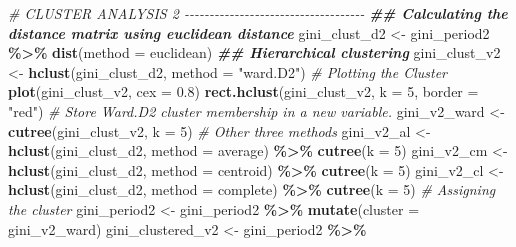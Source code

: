 \documentclass[11pt,a4paper,]{article}
\newenvironment{Shaded}{\begin{snugshade}}{\end{snugshade}}
\newcommand{\AttributeTok}[1]{\textcolor[rgb]{0.13,0.29,0.53}{#1}}
\newcommand{\CommentTok}[1]{\textcolor[rgb]{0.56,0.35,0.01}{\textit{#1}}}
\newcommand{\DecValTok}[1]{\textcolor[rgb]{0.00,0.00,0.81}{#1}}
\newcommand{\DocumentationTok}[1]{\textcolor[rgb]{0.56,0.35,0.01}{\textbf{\textit{#1}}}}
\newcommand{\FloatTok}[1]{\textcolor[rgb]{0.00,0.00,0.81}{#1}}
\newcommand{\FunctionTok}[1]{\textcolor[rgb]{0.13,0.29,0.53}{\textbf{#1}}}
\newcommand{\NormalTok}[1]{#1}
\newcommand{\OtherTok}[1]{\textcolor[rgb]{0.56,0.35,0.01}{#1}}
\newcommand{\SpecialCharTok}[1]{\textcolor[rgb]{0.81,0.36,0.00}{\textbf{#1}}}
\newcommand{\StringTok}[1]{\textcolor[rgb]{0.31,0.60,0.02}{#1}}
\begin{document}
\begin{Shaded}
\begin{Highlighting}[]
\CommentTok{\# CLUSTER ANALYSIS 2  {-}{-}{-}{-}{-}{-}{-}{-}{-}{-}{-}{-}{-}{-}{-}{-}{-}{-}{-}{-}{-}{-}{-}{-}{-}{-}{-}{-}{-}{-}{-}{-}{-}{-}{-}{-}}
\DocumentationTok{\#\# Calculating the distance matrix using euclidean distance}
\NormalTok{gini\_clust\_d2 }\OtherTok{\textless{}{-}}\NormalTok{ gini\_period2 }\SpecialCharTok{\%\textgreater{}\%} \FunctionTok{dist}\NormalTok{(}\AttributeTok{method =} \StringTok{\textquotesingle{}euclidean\textquotesingle{}}\NormalTok{)}
\DocumentationTok{\#\# Hierarchical clustering }
\NormalTok{gini\_clust\_v2 }\OtherTok{\textless{}{-}} \FunctionTok{hclust}\NormalTok{(gini\_clust\_d2, }\AttributeTok{method =} \StringTok{"ward.D2"}\NormalTok{)}
\CommentTok{\# Plotting the Cluster}
\FunctionTok{plot}\NormalTok{(gini\_clust\_v2, }\AttributeTok{cex =} \FloatTok{0.8}\NormalTok{)}
\FunctionTok{rect.hclust}\NormalTok{(gini\_clust\_v2, }\AttributeTok{k =} \DecValTok{5}\NormalTok{, }\AttributeTok{border =} \StringTok{"red"}\NormalTok{)}
\CommentTok{\# Store Ward.D2 cluster membership in a new variable.}
\NormalTok{gini\_v2\_ward }\OtherTok{\textless{}{-}} \FunctionTok{cutree}\NormalTok{(gini\_clust\_v2, }\AttributeTok{k =} \DecValTok{5}\NormalTok{)}
\CommentTok{\# Other three methods}
\NormalTok{gini\_v2\_al }\OtherTok{\textless{}{-}} \FunctionTok{hclust}\NormalTok{(gini\_clust\_d2, }\AttributeTok{method =} \StringTok{\textquotesingle{}average\textquotesingle{}}\NormalTok{) }\SpecialCharTok{\%\textgreater{}\%} \FunctionTok{cutree}\NormalTok{(}\AttributeTok{k =} \DecValTok{5}\NormalTok{) }
\NormalTok{gini\_v2\_cm }\OtherTok{\textless{}{-}} \FunctionTok{hclust}\NormalTok{(gini\_clust\_d2, }\AttributeTok{method =} \StringTok{\textquotesingle{}centroid\textquotesingle{}}\NormalTok{) }\SpecialCharTok{\%\textgreater{}\%} \FunctionTok{cutree}\NormalTok{(}\AttributeTok{k =} \DecValTok{5}\NormalTok{) }
\NormalTok{gini\_v2\_cl }\OtherTok{\textless{}{-}} \FunctionTok{hclust}\NormalTok{(gini\_clust\_d2, }\AttributeTok{method =} \StringTok{\textquotesingle{}complete\textquotesingle{}}\NormalTok{) }\SpecialCharTok{\%\textgreater{}\%} \FunctionTok{cutree}\NormalTok{(}\AttributeTok{k =} \DecValTok{5}\NormalTok{) }
\CommentTok{\# Assigning the cluster}
\NormalTok{gini\_period2 }\OtherTok{\textless{}{-}}\NormalTok{ gini\_period2 }\SpecialCharTok{\%\textgreater{}\%} \FunctionTok{mutate}\NormalTok{(}\AttributeTok{cluster =}\NormalTok{ gini\_v2\_ward)}
\NormalTok{gini\_clustered\_v2 }\OtherTok{\textless{}{-}}\NormalTok{ gini\_period2 }\SpecialCharTok{\%\textgreater{}\%}

\end{Highlighting}
\end{Shaded}
\end{document}
